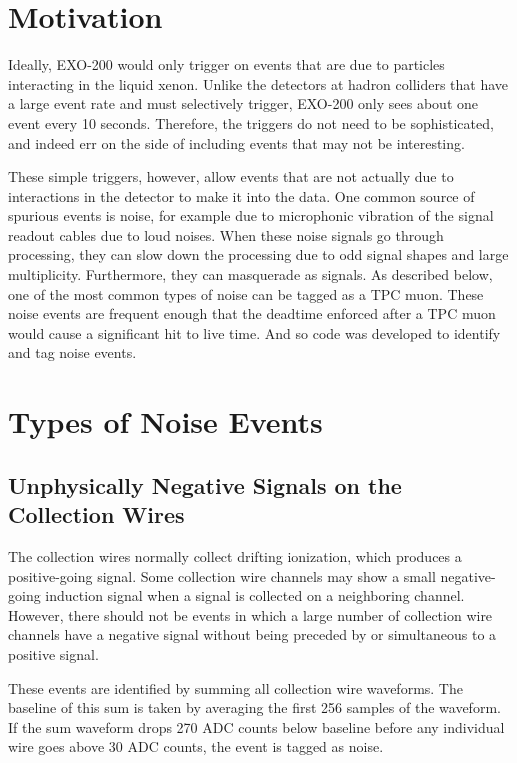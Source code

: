 \documentclass[herrin-thesis.tex]{subfiles}
\begin{document}
\section{Motivation}
Ideally, EXO-200 would only trigger on events that are due to particles interacting in the liquid xenon. Unlike the detectors at hadron colliders that have a large event rate and must selectively trigger, EXO-200 only sees about one event every 10 seconds. Therefore, the triggers do not need to be sophisticated, and indeed err on the side of including events that may not be interesting.

These simple triggers, however, allow events that are not actually due to interactions in the detector to make it into the data. One common source of spurious events is noise, for example due to microphonic vibration of the signal readout cables due to loud noises. When these noise signals go through processing, they can slow down the processing due to odd signal shapes and large multiplicity. Furthermore, they can masquerade as signals. As described below, one of the most common types of noise can be tagged as a TPC muon. These noise events are frequent enough that the deadtime enforced after a TPC muon would cause a significant hit to live time. And so code was developed to identify and tag noise events.

\section{Types of Noise Events}
\subsection{Unphysically Negative Signals on the Collection Wires}
The collection wires normally collect drifting ionization, which produces a positive-going signal. Some collection wire channels may show a small negative-going induction signal when a signal is collected on a neighboring channel. However, there should not be events in which a large number of collection wire channels have a negative signal without being preceded by or simultaneous to a positive signal.

These events are identified by summing all collection wire waveforms. The baseline of this sum is taken by averaging the first 256 samples of the waveform. If the sum waveform drops 270 ADC counts below baseline before any individual wire goes above 30 ADC counts, the event is tagged as noise.
\end{document}
